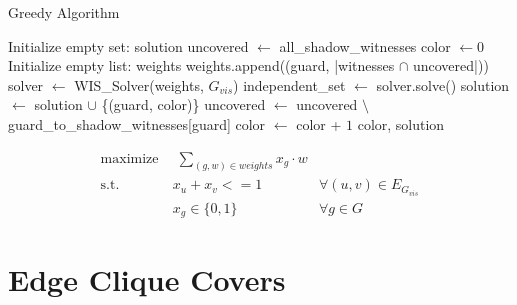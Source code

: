 \begin{algorithm}
\caption{Greedy Algorithm}\label{alg:greedy}
\begin{algorithmic}[1]
\State Initialize empty set: solution
\State uncovered $\gets$ all\_shadow\_witnesses
\State color $\gets 0$
    \State Initialize empty list: weights
        \State weights.append((guard, |witnesses $\cap$ uncovered|))
    \EndFor
    \State solver $\gets$ WIS\_Solver(weights, $G_{vis}$)
    \State independent\_set $\gets$ solver.solve()
        \State solution $\gets$ solution $\cup$ \{(guard, color)\}
        \State uncovered $\gets$ uncovered $\setminus$ guard\_to\_shadow\_witnesses[guard]
    \EndFor 
    \State color $\gets$ color + $1$
\EndWhile
\State \Return color, solution
\EndProcedure
\end{algorithmic}
\end{algorithm}

\begin{align}
\label{eq_MIP:f.0} \mbox{maximize}~& \;\sum_{(g, w)\in weights} x_{g}\cdot w& \\
\label{eq_MIP:f.1} \mbox{s.t. } &x_{u} + x_{v} <= 1 & \forall (u,v) \in E_{G_{vis}}\\
\label{eq_MIP:f.6}& x_{g} \in \{0,1\} & \forall g\in G
\end{align}

\section{Edge Clique Covers}

